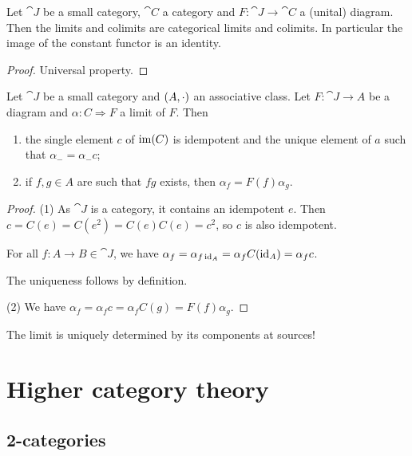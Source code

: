 \begin{proposition}
Let $\cat{J}$ be a small category, $\cat{C}$ a category and $F: \cat{J}\to \cat{C}$ a (unital) diagram. Then the limits and colimits are categorical limits and colimits. In particular the image of the constant functor is an identity.
\end{proposition}
\begin{proof}
Universal property.
\end{proof}

\begin{proposition}
Let $\cat{J}$ be a small category and $\left( A,\cdot \right)$ an associative class. Let $F: \cat{J}\to A$ be a diagram and $\alpha: C\Rightarrow F$ a limit of $F$. Then
\begin{enumerate}
\item the single element $c$ of $\operatorname{im}(C)$ is idempotent and the unique element of $a$ such that $\alpha_- = \alpha_-c$;
\item if $f,g\in A$ are such that $fg$ exists, then $\alpha_f = F(f)\alpha_g$.
\end{enumerate}
\end{proposition}
\begin{proof}
(1) As $\cat{J}$ is a category, it contains an idempotent $e$. Then $c = C(e) = C(e^2) = C(e)C(e) = c^2$, so $c$ is also idempotent.

For all $f:A\to B\in \cat{J}$, we have $\alpha_f = \alpha_{f\operatorname{id}_A} = \alpha_f C(\operatorname{id}_A) = \alpha_f c$.

The uniqueness follows by definition.

(2) We have $\alpha_f = \alpha_fc = \alpha_f C(g) = F(f)\alpha_g$.
\end{proof}

The limit is uniquely determined by its components at sources!

\chapter{Higher category theory}
\section{2-categories}

